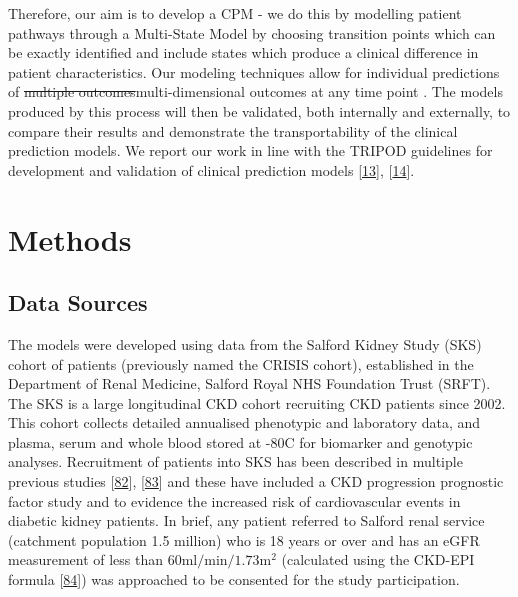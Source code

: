\documentclass[12pt,PhD,twoside,openright]{muthesis}
\begin{document}
Therefore, our aim is to develop a CPM - we do this by modelling patient pathways through a Multi-State Model by choosing transition points which can be exactly identified and include states which produce a clinical difference in patient characteristics. Our modeling techniques allow for individual predictions of \sout{multiple outcomes}multi-dimensional outcomes at any time point . The models produced by this process will then be validated, both internally and externally, to compare their results and demonstrate the transportability of the clinical prediction models. We report our work in line with the TRIPOD guidelines for development and validation of clinical prediction models {[}\protect\hyperlink{ref-collins_transparent_2015}{13}{]}, {[}\protect\hyperlink{ref-moons_transparent_2015}{14}{]}.

\hypertarget{methods-6}{%
\section{Methods}\label{methods-6}}

\hypertarget{data-sources}{%
\subsection{Data Sources}\label{data-sources}}

The models were developed using data from the Salford Kidney Study (SKS) cohort of patients (previously named the CRISIS cohort), established in the Department of Renal Medicine, Salford Royal NHS Foundation Trust (SRFT). The SKS is a large longitudinal CKD cohort recruiting CKD patients since 2002. This cohort collects detailed annualised phenotypic and laboratory data, and plasma, serum and whole blood stored at -80\textdegree C for biomarker and genotypic analyses. Recruitment of patients into SKS has been described in multiple previous studies {[}\protect\hyperlink{ref-hoefield_factors_2010}{82}{]}, {[}\protect\hyperlink{ref-chinnadurai_increased_2019-1}{83}{]} and these have included a CKD progression prognostic factor study and to evidence the increased risk of cardiovascular events in diabetic kidney patients. In brief, any patient referred to Salford renal service (catchment population 1.5 million) who is 18 years or over and has an eGFR measurement of less than \(60\textrm{ml}/\textrm{min}/1.73\textrm{m}^2\) (calculated using the CKD-EPI formula {[}\protect\hyperlink{ref-levey_new_2009}{84}{]}) was approached to be consented for the study participation.
\end{document}
